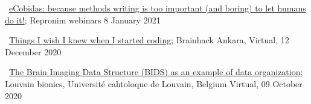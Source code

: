 \textbullet~\href{https://osf.io/fb7tx/}{eCobidas: because methods writing is too important (and boring) to let humans do it!}; 
Repronim webinars 
8 January 2021


\textbullet~\href{https://osf.io/vdgua/}{Things I wish I knew when I started coding}; 
Brainhack Ankara,
Virtual,
12 December 2020


\textbullet~\href{https://osf.io/zf5x8/}{The Brain Imaging Data Structure (BIDS) as an example of data organization}; 
Louvain bionics, Université cahtoloque de Louvain, Belgium
Virtual,
09 October 2020
